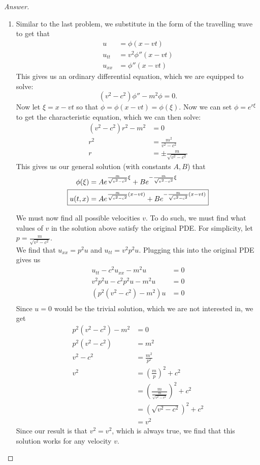 \documentclass{article}
\theoremstyle{definition}
\renewcommand\qedsymbol{$\blacksquare$}
\newenvironment{ans}{\begin{proof}[Answer]\renewcommand{\qedsymbol}{}}{\end{proof}}
\begin{document}
\begin{ans}
\begin{enumerate}[start=38, resume*=answers]
    \item Similar to the last problem, we substitute in the form of the travelling wave to get that
    \begin{align*}
        u &= \phi(x-vt)\\
        u_{tt} &= v^2\phi''(x-vt)\\
        u_{xx} &= \phi''(x-vt)
    \end{align*}
    This gives us an ordinary differential equation, which we are equipped to solve:
    \[(v^2 - c^2)\phi'' - m^2\phi = 0.\]
    Now let $\xi = x-vt$ so that $\phi = \phi(x-vt) = \phi(\xi)$. Now we can set $\phi = e^{r\xi}$ to get the characteristic equation, which we can then solve:
    \begin{align*}
        (v^2 - c^2)r^2 - m^2 &= 0\\
        r^2 &= \frac{m^2}{v^2 - c^2}\\
        r &= \pm \frac{m}{\sqrt{v^2 - c^2}}
    \end{align*}
    This gives us our general solution (with constants $A, B$) that
    \begin{align*}
        \phi(\xi) &= Ae^{\frac{m}{\sqrt{v^2 - c^2}}\xi} + Be^{-\frac{m}{\sqrt{v^2 - c^2}}\xi}\\
        \Aboxed{u(t,x) &= Ae^{\frac{m}{\sqrt{v^2 - c^2}}(x-vt)} + Be^{-\frac{m}{\sqrt{v^2 - c^2}}(x-vt)}}
    \end{align*}

    We must now find all possible velocities $v$. To do such, we must find what values of $v$ in the solution above satisfy the original PDE. For simplicity, let $p = \frac{m}{\sqrt{v^2 - c^2}}$.\\

    We find that $u_{xx} = p^2 u$ and $u_{tt} = v^2p^2u$. Plugging this into the original PDE gives us
    \begin{align*}
        u_{tt} -c^2u_{xx} - m^2u &=0\\
        v^2p^2u - c^2p^2u - m^2u &=0\\
        (p^2(v^2 - c^2) - m^2)u &= 0\\
    \end{align*}
    Since $u = 0$ would be the trivial solution, which we are not interested in, we get
    \begin{align*}
        p^2(v^2 - c^2) - m^2 &= 0\\
        p^2(v^2 - c^2) &= m^2\\
        v^2 - c^2 &= \frac{m^2}{p^2}\\
        v^2 &= \left(\frac{m}{p}\right)^2 + c^2\\
        &= \left(\frac{m}{\frac{m}{\sqrt{v^2 - c^2}}}\right)^2 + c^2\\
        &= (\sqrt{v^2 - c^2})^2 + c^2\\
        &= v^2
    \end{align*}
    Since our result is that $v^2 = v^2$, which is always true, we find that this solution works for any velocity $v$.


\end{enumerate}
\end{ans}
\end{document}
